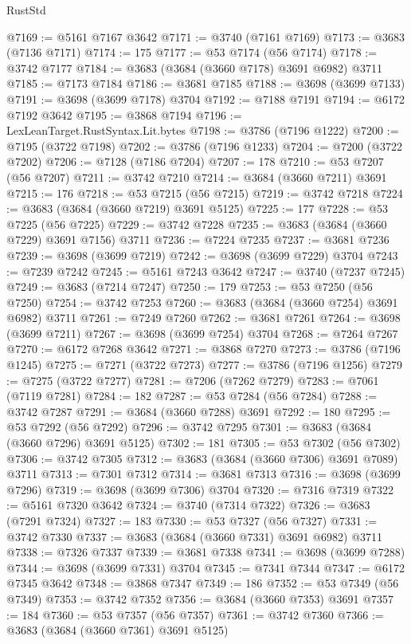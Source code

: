 \begin{lexlean}{RustStd}
\begin{coremodule}
@7169 := @5161 @7167 @3642
@7171 := @3740 (@7161 @7169)
@7173 := @3683 (@7136 @7171)
@7174 := 175
@7177 := @53 @7174 (@56 @7174)
@7178 := @3742 @7177
@7184 := @3683 (@3684 (@3660 @7178) @3691 @6982) @3711
@7185 := @7173 @7184
@7186 := @3681 @7185
@7188 := @3698 (@3699 @7133)
@7191 := @3698 (@3699 @7178) @3704
@7192 := @7188 @7191
@7194 := @6172 @7192 @3642
@7195 := @3868 @7194
@7196 := LexLeanTarget.RustSyntax.Lit.bytes
@7198 := @3786 (@7196 @1222)
@7200 := @7195 (@3722 @7198)
@7202 := @3786 (@7196 @1233)
@7204 := @7200 (@3722 @7202)
@7206 := @7128 (@7186 @7204)
@7207 := 178
@7210 := @53 @7207 (@56 @7207)
@7211 := @3742 @7210
@7214 := @3684 (@3660 @7211) @3691
@7215 := 176
@7218 := @53 @7215 (@56 @7215)
@7219 := @3742 @7218
@7224 := @3683 (@3684 (@3660 @7219) @3691 @5125)
@7225 := 177
@7228 := @53 @7225 (@56 @7225)
@7229 := @3742 @7228
@7235 := @3683 (@3684 (@3660 @7229) @3691 @7156) @3711
@7236 := @7224 @7235
@7237 := @3681 @7236
@7239 := @3698 (@3699 @7219)
@7242 := @3698 (@3699 @7229) @3704
@7243 := @7239 @7242
@7245 := @5161 @7243 @3642
@7247 := @3740 (@7237 @7245)
@7249 := @3683 (@7214 @7247)
@7250 := 179
@7253 := @53 @7250 (@56 @7250)
@7254 := @3742 @7253
@7260 := @3683 (@3684 (@3660 @7254) @3691 @6982) @3711
@7261 := @7249 @7260
@7262 := @3681 @7261
@7264 := @3698 (@3699 @7211)
@7267 := @3698 (@3699 @7254) @3704
@7268 := @7264 @7267
@7270 := @6172 @7268 @3642
@7271 := @3868 @7270
@7273 := @3786 (@7196 @1245)
@7275 := @7271 (@3722 @7273)
@7277 := @3786 (@7196 @1256)
@7279 := @7275 (@3722 @7277)
@7281 := @7206 (@7262 @7279)
@7283 := @7061 (@7119 @7281)
@7284 := 182
@7287 := @53 @7284 (@56 @7284)
@7288 := @3742 @7287
@7291 := @3684 (@3660 @7288) @3691
@7292 := 180
@7295 := @53 @7292 (@56 @7292)
@7296 := @3742 @7295
@7301 := @3683 (@3684 (@3660 @7296) @3691 @5125)
@7302 := 181
@7305 := @53 @7302 (@56 @7302)
@7306 := @3742 @7305
@7312 := @3683 (@3684 (@3660 @7306) @3691 @7089) @3711
@7313 := @7301 @7312
@7314 := @3681 @7313
@7316 := @3698 (@3699 @7296)
@7319 := @3698 (@3699 @7306) @3704
@7320 := @7316 @7319
@7322 := @5161 @7320 @3642
@7324 := @3740 (@7314 @7322)
@7326 := @3683 (@7291 @7324)
@7327 := 183
@7330 := @53 @7327 (@56 @7327)
@7331 := @3742 @7330
@7337 := @3683 (@3684 (@3660 @7331) @3691 @6982) @3711
@7338 := @7326 @7337
@7339 := @3681 @7338
@7341 := @3698 (@3699 @7288)
@7344 := @3698 (@3699 @7331) @3704
@7345 := @7341 @7344
@7347 := @6172 @7345 @3642
@7348 := @3868 @7347
@7349 := 186
@7352 := @53 @7349 (@56 @7349)
@7353 := @3742 @7352
@7356 := @3684 (@3660 @7353) @3691
@7357 := 184
@7360 := @53 @7357 (@56 @7357)
@7361 := @3742 @7360
@7366 := @3683 (@3684 (@3660 @7361) @3691 @5125)

\end{coremodule}
\end{lexlean}
